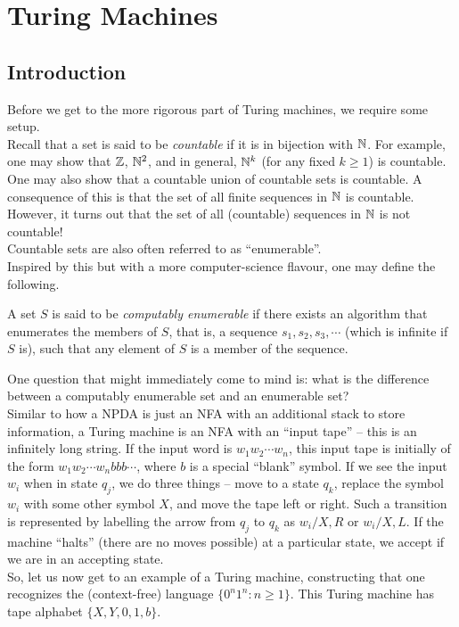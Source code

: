 \section{Turing Machines}

\subsection{Introduction}

	Before we get to the more rigorous part of Turing machines, we require some setup. \\
	Recall that a set is said to be \emph{countable} if it is in bijection with $\mathbb{N}$. For example, one may show that $\mathbb{Z}$, $\mathbb{N}^2$, and in general, $\mathbb{N}^k$ (for any fixed $k \ge 1$) is countable.\\
	One may also show that a countable union of countable sets is countable. A consequence of this is that the set of all finite sequences in $\mathbb{N}$ is countable. However, it turns out that the set of all (countable) sequences in $\mathbb{N}$ is not countable!\\
	Countable sets are also often referred to as ``enumerable''.\\

	Inspired by this but with a more computer-science flavour, one may define the following.

	\begin{fdef}
		A set $S$ is said to be \emph{computably enumerable} if there exists an algorithm that enumerates the members of $S$, that is, a sequence $s_1, s_2, s_3, \cdots$ (which is infinite if $S$ is), such that any element of $S$ is a member of the sequence.
	\end{fdef}

	One question that might immediately come to mind is: what is the difference between a computably enumerable set and an enumerable set? \\

	Similar to how a NPDA is just an NFA with an additional stack to store information, a Turing machine is an NFA with an ``input tape'' -- this is an infinitely long string. If the input word is $w_1w_2 \cdots w_n$, this input tape is initially of the form $w_1 w_2 \cdots w_n b b b \cdots$, where $b$ is a special ``blank'' symbol. If we see the input $w_i$ when in state $q_j$, we do three things -- move to a state $q_k$, replace the symbol $w_i$ with some other symbol $X$, and move the tape left or right. Such a transition is represented by labelling the arrow from $q_j$ to $q_k$ as $w_i / X, R$ or $w_i / X, L$. If the machine ``halts'' (there are no moves possible) at a particular state, we accept if we are in an accepting state.\\
	So, let us now get to an example of a Turing machine, constructing that one recognizes the (context-free) language $\{ 0^n 1^n : n \ge 1 \}$. This Turing machine has tape alphabet $\{X,Y,0,1,b\}$.

